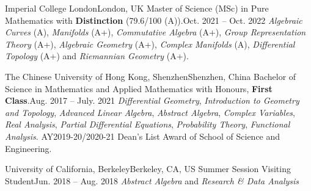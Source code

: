\HeadingItemListStart
	\HeadingItem
		{Imperial College London}{London, UK}
		{Master of Science (MSc) in Pure Mathematics with \textbf{Distinction} (79.6/100 (A)).}{Oct. 2021 -- Oct. 2022}
		\ItemListStart
				{\textit{Algebraic Curves} (A),
				\textit{Manifolds} (A+),
				\textit{Commutative Algebra} (A+),
				\textit{Group Representation Theory} (A+),
				\textit{Algebraic Geometry} (A+),
				\textit{Complex Manifolds} (A),
				\textit{Differential Topology} (A+)
				and \textit{Riemannian Geometry} (A+).}
		\ItemListEnd

	\HeadingItem
		{The Chinese University of Hong Kong, Shenzhen}{Shenzhen, China}
		{Bachelor of Science in Mathematics and Applied Mathematics with Honours, \textbf{First Class}.}{Aug. 2017 -- July. 2021}
		\ItemListStart
				{\textit{Differential Geometry}, \textit{Introduction to Geometry and Topology}, \textit{Advanced Linear Algebra}, \textit{Abstract Algebra}, \textit{Complex Variables}, \textit{Real Analysis}, \textit{Partial Differential Equations}, \textit{Probability Theory}, \textit{Functional Analysis}.}
				{AY2019-20/2020-21 Dean's List Award of School of Science and Engineering.}
		\ItemListEnd

	\HeadingItem
		{University of California, Berkeley}{Berkeley, CA, US}
		{Summer Session Visiting Student}{Jun. 2018 -- Aug. 2018}
		\ItemListStart
				{\textit{Abstract Algebra} and \textit{Research \& Data Analysis}}
		\ItemListEnd


\HeadingItemListEnd